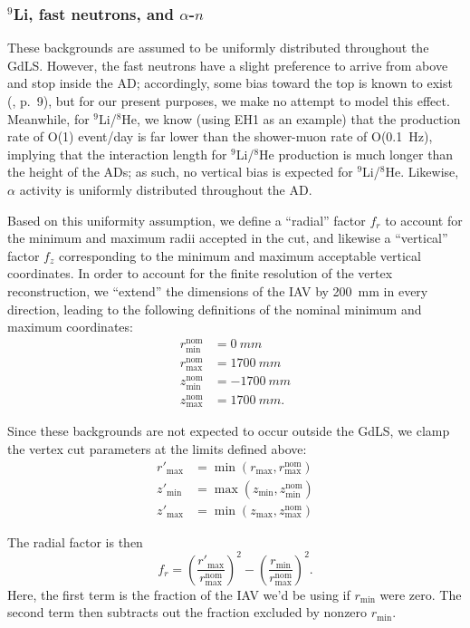 \documentclass[../thesis.tex]{subfiles}
\begin{document}
\subsubsection{$^9$Li, fast neutrons, and $\alpha$-$n$}

These backgrounds are assumed to be uniformly distributed throughout the GdLS. However, the fast neutrons have a slight preference to arrive from above and stop inside the AD; accordingly, some bias toward the top is known to exist (\cite{jianrunHERA}, p.\ 9), but for our present purposes, we make no attempt to model this effect.
%
Meanwhile, for $^9$Li/$^8$He, we know (using EH1 as an example) that the production rate of O(1) event/day is far lower than the shower-muon rate of O(0.1~Hz), implying that the interaction length for $^9$Li/$^8$He production is much longer than the height of the ADs; as such, no vertical bias is expected for $^9$Li/$^8$He.
%
Likewise, $\alpha$ activity is uniformly distributed throughout the AD.

Based on this uniformity assumption, we define a ``radial'' factor $f_r$ to account for the minimum and maximum radii accepted in the cut, and likewise a ``vertical'' factor $f_z$ corresponding to the minimum and maximum acceptable vertical coordinates. In order to account for the finite resolution of the vertex reconstruction, we ``extend'' the dimensions of the IAV by 200~mm in every direction, leading to the following definitions of the nominal minimum and maximum coordinates:
\begin{align*}
  r_{\mathrm{min}}^{\mathrm{nom}} &= \SI{0}{mm}\\
  r_{\mathrm{max}}^{\mathrm{nom}} &= \SI{1700}{mm}\\
  z_{\mathrm{min}}^{\mathrm{nom}} &= \SI{-1700}{mm}\\
  z_{\mathrm{max}}^{\mathrm{nom}} &= \SI{1700}{mm}.
\end{align*}

Since these backgrounds are not expected to occur outside the GdLS, we clamp the vertex cut parameters at the limits defined above:
\begin{align*}
  r'_{\mathrm{max}} &= \min(r_{\mathrm{max}}, r_{\mathrm{max}}^{\mathrm{nom}})\\
  z'_{\mathrm{min}} &= \max(z_{\mathrm{min}}, z_{\mathrm{min}}^{\mathrm{nom}})\\
  z'_{\mathrm{max}} &= \min(z_{\mathrm{max}}, z_{\mathrm{max}}^{\mathrm{nom}})
\end{align*}

The radial factor is then
\[
  f_r = \left(\frac{r'_{\mathrm{max}}}{r_{\mathrm{max}}^{\mathrm{nom}}}\right)^2 - \left(\frac{r_{\mathrm{min}}}{r_{\mathrm{max}}^{\mathrm{nom}}} \right)^2.
\]
Here, the first term is the fraction of the IAV we'd be using if $r_{\mathrm{min}}$ were zero. The second term then subtracts out the fraction excluded by nonzero $r_{\mathrm{min}}$.
\end{document}
